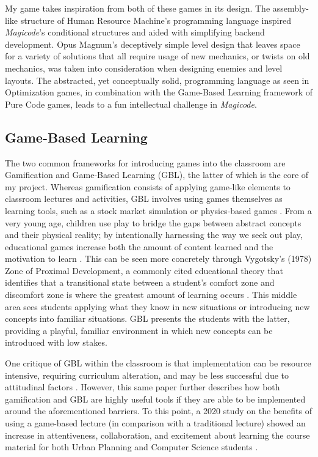 \documentclass[10pt,twocolumn]{article}
\begin{document}
My game takes inspiration from both of these games in its design. The assembly-like structure of Human Resource Machine’s programming language inspired \textit{Magicode}’s conditional structures and aided with simplifying backend development. Opus Magnum’s deceptively simple level design that leaves space for a variety of solutions that all require usage of new mechanics, or twists on old mechanics, was taken into consideration when designing enemies and level layouts. The abstracted, yet conceptually solid, programming language as seen in Optimization games, in combination with the Game-Based Learning framework of Pure Code games, leads to a fun intellectual challenge in \textit{Magicode}.

\subsection{Game-Based Learning}
The two common frameworks for introducing games into the classroom are Gamification and Game-Based Learning (GBL), the latter of which is the core of my project. Whereas gamification consists of applying game-like elements to classroom lectures and activities, GBL involves using games themselves as learning tools, such as a stock market simulation or physics-based games \cite{gbl-waterloo}. From a very young age, children use play to bridge the gaps between abstract concepts and their physical reality; by intentionally harnessing the way we seek out play, educational games increase both the amount of content learned and the motivation to learn \cite{foundations-gbl}. This can be seen more concretely through Vygotsky’s (1978) Zone of Proximal Development, a commonly cited educational theory that identifies that a transitional state between a student’s comfort zone and discomfort zone is where the greatest amount of learning occurs \cite{vygotsky}. This middle area sees students applying what they know in new situations or introducing new concepts into familiar situations. GBL presents the students with the latter, providing a playful, familiar environment in which new concepts can be introduced with low stakes.

One critique of GBL within the classroom is that implementation can be resource intensive, requiring curriculum alteration, and may be less successful due to attitudinal factors \cite{drivers-barriers}. However, this same paper further describes how both gamification and GBL are highly useful tools if they are able to be implemented around the aforementioned barriers. To this point, a 2020 study on the benefits of using a game-based lecture (in comparison with a traditional lecture) showed an increase in attentiveness, collaboration, and excitement about learning the course material for both Urban Planning and Computer Science students \cite{game-on-gbl}. 
\end{document}
